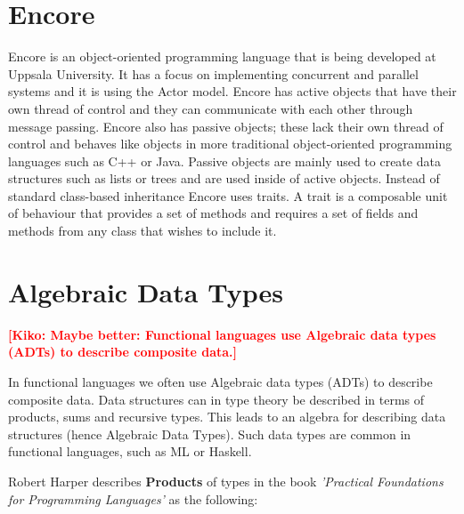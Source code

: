 \documentclass[10pt]{report}
\newcommand{\KIKO}[1]{\textcolor{red}{\textbf{[Kiko: #1]}}}
\begin{document}
%
\label{ch:background}
%

\section{Encore}
\par{Encore is an object-oriented programming language that is being developed at Uppsala University\cite{Encore}. It has a focus on implementing concurrent and parallel systems and it is using the Actor model. Encore has active objects that have their own thread of control and they can communicate with each other through message passing. Encore also has passive objects; these lack their own thread of control and behaves like objects in more traditional object-oriented programming languages such as C++ or Java. Passive objects are mainly used to create data structures such as lists or trees and are used inside of active objects. Instead of standard class-based inheritance Encore uses traits.  A trait is a composable unit of behaviour that provides a set of methods and requires a set of fields and methods from any class that wishes to include it.} %
\section{Algebraic Data Types}
\KIKO{Maybe better: Functional languages use Algebraic data types (ADTs) to describe composite data.}
\par{In functional languages we often use Algebraic data types (ADTs) to describe composite data. Data structures can in type theory be described in terms of products, sums and recursive types. This leads to an algebra for describing data structures (hence Algebraic Data Types). Such data types are common in functional languages, such as ML or Haskell.}

\par{Robert Harper describes \textbf{Products} of types in the book \textit{'Practical Foundations for Programming Languages'} as the following:}
\end{document}
